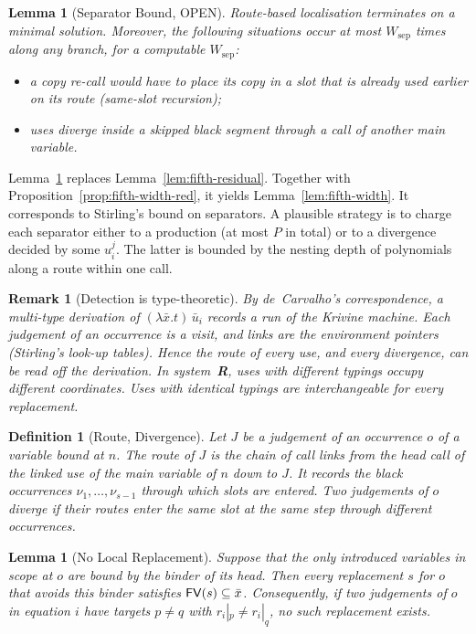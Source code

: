 \documentclass[10pt,a4paper]{article}
\theoremstyle{plain}%
\newtheorem{definition}[theorem]{Definition}
\newtheorem{lemma}[theorem]{Lemma}
\newtheorem{remark}[theorem]{Remark}
\begin{document}
\begin{lemma}[Separator Bound, OPEN]\label{lem:fifth-separator}
Route-based localisation terminates on a minimal solution.
Moreover, the following situations occur at most $W_{\mathrm{sep}}$ times along any branch, for a computable $W_{\mathrm{sep}}$:
\begin{itemize}
\item a copy re-call would have to place its copy in a slot that is already used earlier on its route (same-slot recursion);
\item uses diverge inside a skipped black segment through a call of another main variable.
\end{itemize}
\end{lemma}

Lemma~\ref{lem:fifth-separator} replaces Lemma~\ref{lem:fifth-residual}.
Together with Proposition~\ref{prop:fifth-width-red}, it yields Lemma~\ref{lem:fifth-width}.
It corresponds to Stirling's bound on separators.
A plausible strategy is to charge each separator either to a production (at most $P$ in total) or to a divergence decided by some $u_i^j$.
The latter is bounded by the nesting depth of polynomials along a route within one call.

\begin{remark}[Detection is type-theoretic]
By de~Carvalho's correspondence, a multi-type derivation of $(\lambda\bar x.t)\,\bar u_i$ records a run of the Krivine machine.
Each judgement of an occurrence is a visit, and links are the environment pointers (Stirling's look-up tables).
Hence the route of every use, and every divergence, can be read off the derivation.
In system~\textbf{R}, uses with different typings occupy different coordinates.
Uses with identical typings are interchangeable for every replacement.
\end{remark}

\begin{definition}[Route, Divergence]
Let $J$ be a judgement of an occurrence $o$ of a variable bound at $n$.
The \emph{route} of $J$ is the chain of call links from the head call of the linked use of the main variable of $n$ down to $J$.
It records the black occurrences $\nu_1, \ldots, \nu_{s-1}$ through which slots are entered.
Two judgements of $o$ \emph{diverge} if their routes enter the same slot at the same step through different occurrences.
\end{definition}

\begin{lemma}[No Local Replacement]\label{lem:fifth-nolocal}
Suppose that the only introduced variables in scope at $o$ are bound by the binder of its head.
Then every replacement $s$ for $o$ that avoids this binder satisfies $\mathsf{FV}(s) \subseteq \bar x$.
Consequently, if two judgements of $o$ in equation $i$ have targets $p \neq q$ with $r_i|_p \neq r_i|_q$, no such replacement exists.
\end{lemma}
\end{document}
